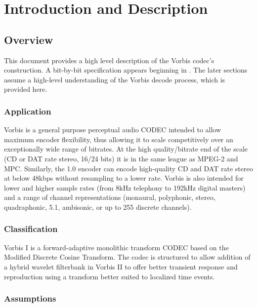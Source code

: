 \section{Introduction and Description} \label{vorbis:spec:intro}

\subsection{Overview}

This document provides a high level description of the Vorbis codec's
construction.  A bit-by-bit specification appears beginning in
.
The later sections assume a high-level
understanding of the Vorbis decode process, which is
provided here.

\subsubsection{Application}
Vorbis is a general purpose perceptual audio CODEC intended to allow
maximum encoder flexibility, thus allowing it to scale competitively
over an exceptionally wide range of bitrates.  At the high
quality/bitrate end of the scale (CD or DAT rate stereo, 16/24 bits)
it is in the same league as MPEG-2 and MPC.  Similarly, the 1.0
encoder can encode high-quality CD and DAT rate stereo at below 48kbps
without resampling to a lower rate.  Vorbis is also intended for
lower and higher sample rates (from 8kHz telephony to 192kHz digital
masters) and a range of channel representations (monaural,
polyphonic, stereo, quadraphonic, 5.1, ambisonic, or up to 255
discrete channels).


\subsubsection{Classification}
Vorbis I is a forward-adaptive monolithic transform CODEC based on the
Modified Discrete Cosine Transform.  The codec is structured to allow
addition of a hybrid wavelet filterbank in Vorbis II to offer better
transient response and reproduction using a transform better suited to
localized time events.


\subsubsection{Assumptions}

